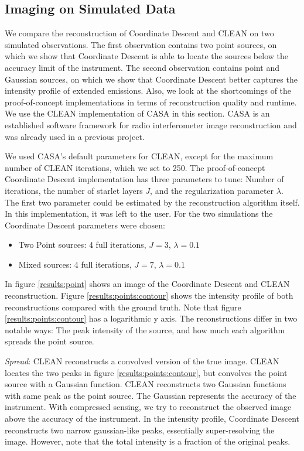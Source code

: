 \subsection{Imaging on Simulated Data}
We compare the reconstruction of Coordinate Descent and CLEAN on two simulated observations. The first observation contains two point sources, on which we show that Coordinate Descent is able to locate the sources below the accuracy limit of the instrument. The second observation contains point and Gaussian sources, on which we show that Coordinate Descent better captures the intensity profile of extended emissions. Also, we look at the shortcomings of the proof-of-concept implementations in terms of reconstruction quality and runtime. We use the CLEAN implementation of CASA in this section. CASA is an established software framework for radio interferometer image reconstruction and was already used in a previous project.


We used CASA's default parameters for CLEAN, except for the maximum number of CLEAN iterations, which we set to 250. The proof-of-concept Coordinate Descent implementation has three parameters to tune: Number of iterations, the number of starlet layers $J$, and the regularization parameter $\lambda$. The first two parameter could be estimated by the reconstruction algorithm itself. In this implementation, it was left to the user. For the two simulations the Coordinate Descent parameters were chosen:
\begin{itemize}
	\item Two Point sources: 4 full iterations, $J=3$, $\lambda=0.1$
	\item Mixed sources: 4 full iterations, $J=7$, $\lambda=0.1$
\end{itemize}

In figure \ref{results:point} shows an image of the Coordinate Descent and CLEAN reconstruction. Figure \ref{results:points:contour} shows the intensity profile of both reconstructions compared with the ground truth. Note that figure \ref{results:points:contour} has a logarithmic y axis. The reconstructions differ in two notable ways: The peak intensity of the source, and how much each algorithm spreads the point source. 

\textit{Spread}: CLEAN reconstructs a convolved version of the true image. CLEAN locates the two peaks in figure \ref{results:points:contour}, but convolves the point source with a Gaussian function. CLEAN reconstructs two Gaussian functions with same peak as the point source. The Gaussian represents the accuracy of the instrument. With compressed sensing, we try to reconstruct the observed image above the accuracy of the instrument. In the intensity profile, Coordinate Descent reconstructs two narrow gaussian-like peaks, essentially super-resolving the image. However, note that the total intensity is a fraction of the original peaks.


